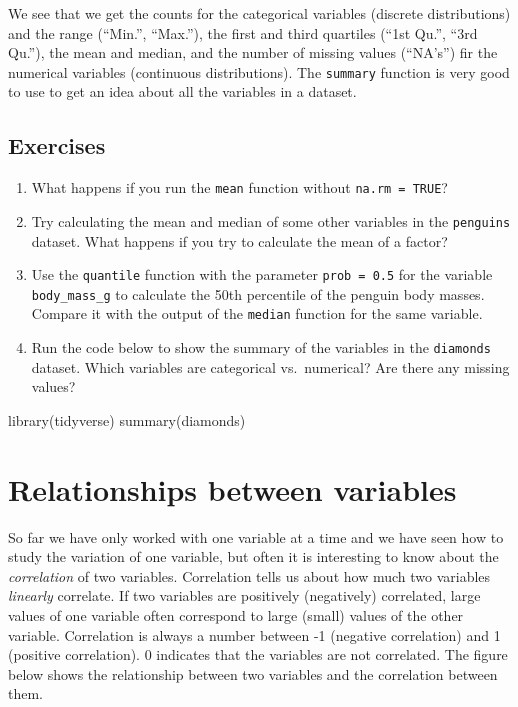\documentclass[
  letterpaper,
  DIV=11,
  numbers=noendperiod]{scrreprt}
\newenvironment{Shaded}{\begin{snugshade}}{\end{snugshade}}
\newcommand{\FunctionTok}[1]{\textcolor[rgb]{0.28,0.35,0.67}{#1}}
\newcommand{\NormalTok}[1]{\textcolor[rgb]{0.00,0.23,0.31}{#1}}
\providecommand{\tightlist}{%
  \setlength{\itemsep}{0pt}\setlength{\parskip}{0pt}}\usepackage{longtable,booktabs,array}
\begin{document}
We see that we get the counts for the categorical variables (discrete
distributions) and the range (``Min.'', ``Max.''), the first and third
quartiles (``1st Qu.'', ``3rd Qu.''), the mean and median, and the
number of missing values (``NA's'') fir the numerical variables
(continuous distributions). The \texttt{summary} function is very good
to use to get an idea about all the variables in a dataset.

\subsection{Exercises}\label{exercises-6}

\begin{enumerate}
\def\labelenumi{\arabic{enumi}.}
\tightlist
\item
  What happens if you run the \texttt{mean} function without
  \texttt{na.rm\ =\ TRUE}?
\item
  Try calculating the mean and median of some other variables in the
  \texttt{penguins} dataset. What happens if you try to calculate the
  mean of a factor?
\item
  Use the \texttt{quantile} function with the parameter
  \texttt{prob\ =\ 0.5} for the variable \texttt{body\_mass\_g} to
  calculate the 50th percentile of the penguin body masses. Compare it
  with the output of the \texttt{median} function for the same variable.
\item
  Run the code below to show the summary of the variables in the
  \texttt{diamonds} dataset. Which variables are categorical
  vs.~numerical? Are there any missing values?
\end{enumerate}

\begin{Shaded}
\begin{Highlighting}[]
\FunctionTok{library}\NormalTok{(tidyverse)}
\FunctionTok{summary}\NormalTok{(diamonds)}
\end{Highlighting}
\end{Shaded}

\section{Relationships between
variables}\label{sec-basicstat-correlation}

So far we have only worked with one variable at a time and we have seen
how to study the variation of one variable, but often it is interesting
to know about the \emph{correlation} of two variables. Correlation tells
us about how much two variables \emph{linearly} correlate. If two
variables are positively (negatively) correlated, large values of one
variable often correspond to large (small) values of the other variable.
Correlation is always a number between -1 (negative correlation) and 1
(positive correlation). 0 indicates that the variables are not
correlated. The figure below shows the relationship between two
variables and the correlation between them.
\end{document}

